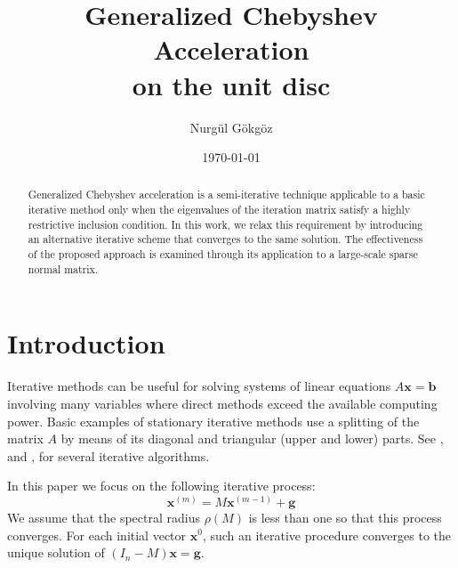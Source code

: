 \documentclass[reqno]{amsart}
\newcommand{\mb}{\mathbf}
\numberwithin{equation}{section}
\theoremstyle{plain}
\theoremstyle{definition}
\begin{document}
	
\title[Generalized Chebyshev Acceleration]{Generalized Chebyshev Acceleration \\on the unit disc}
	
\author[Nurgül Gökgöz]{Nurgül Gökgöz}
\address{Çankaya University, Mathematics Department, 06815 Ankara, Turkey.}
	
	
\date{\today}
	
\begin{abstract}
Generalized Chebyshev acceleration is a semi-iterative technique applicable to a basic iterative method only when the eigenvalues of the iteration matrix satisfy a highly restrictive inclusion condition. In this work, we relax this requirement by introducing an alternative iterative scheme that converges to the same solution. The effectiveness of the proposed approach is examined through its application to a large-scale sparse normal matrix.
\end{abstract}
	
	
	
	
\maketitle
\section{Introduction}
Iterative methods can be useful for solving systems of linear equations $A\mb{x}=\mb{b}$ involving many variables where direct methods exceed the available computing power. Basic examples of stationary iterative methods use a splitting of the matrix $A$ by means of its diagonal and triangular (upper and lower) parts. See \cite{greenbaum}, and \cite{varga}, for several iterative algorithms.

In this paper we focus on the following iterative process:
\begin{equation}\label{iter}
	\mb{x}^{(m)}=M\mb{x}^{(m-1)}+\mb{g}
\end{equation}
We assume that the spectral radius $\rho(M)$ is less than one so that this process converges. For each initial vector $\mb{x}^0$, such an iterative procedure converges to the unique solution of $(I_n-M)\mb{x}=\mb{g}$.
\end{document}
